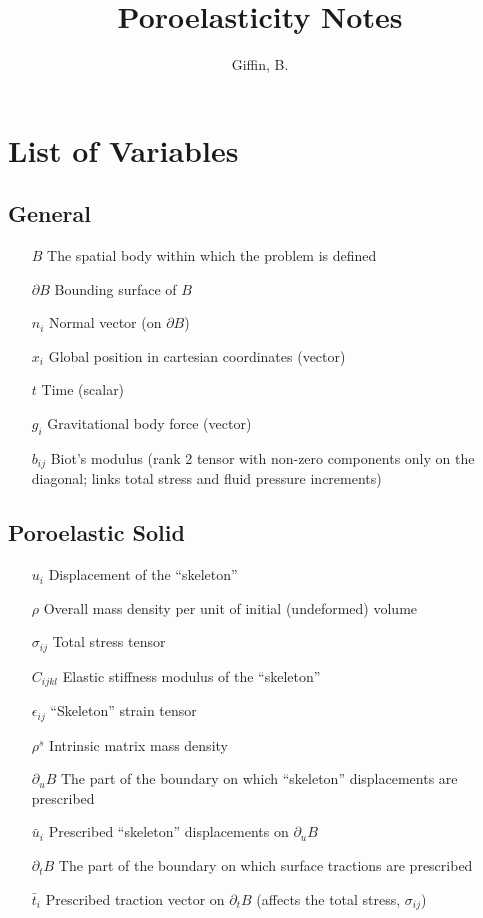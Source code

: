 \documentclass[11pt]{article} %
\title{Poroelasticity Notes}
\author{Giffin, B.}
\begin{document}
\maketitle

\section{List of Variables}

\subsection{General}

\begin{itemize}
	\item[$B$] The spatial body within which the problem is defined
	\item[$\partial B$] Bounding surface of $B$
	\item[$n_i$] Normal vector (on $\partial B$)
	\item[$x_i$] Global position in cartesian coordinates (vector)
	\item[$t$] Time (scalar)
	\item[$g_i$] Gravitational body force (vector)
	\item[$b_{ij}$] Biot's modulus (rank 2 tensor with non-zero components only on the diagonal; links total stress and fluid pressure increments)
\end{itemize}

\subsection{Poroelastic Solid}

\begin{itemize}
	\item[$u_i$] Displacement of the ``skeleton''
	\item[$\rho$] Overall mass density per unit of initial (undeformed) volume
	\item[$\sigma_{ij}$] Total stress tensor
	\item[$C_{ijkl}$] Elastic stiffness modulus of the ``skeleton''
	\item[$\epsilon_{ij}$] ``Skeleton'' strain tensor
	\item[$\rho^s$] Intrinsic matrix mass density
	\item[$\partial_u B$] The part of the boundary on which ``skeleton'' displacements are prescribed
	\item[$\bar{u}_i$] Prescribed ``skeleton'' displacements on $\partial_u B$
	\item[$\partial_t B$] The part of the boundary on which surface tractions are prescribed
	\item[$\bar{t}_i$] Prescribed traction vector on $\partial_t B$ (affects the total stress, $\sigma_{ij}$)
\end{itemize}
\end{document}
